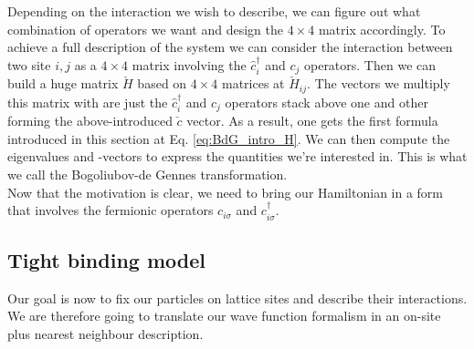 \documentclass[../main.tex]{subfile}
\begin{document}
Depending on the interaction we wish to describe, we can figure out what combination of operators we want and design the $4\times4$ matrix accordingly.
To achieve a full description of the system we can consider the interaction between two site $i,j$ as a $4\times4$ matrix involving the $\hat{c}_i^{\dagger}$ and $c_j$ operators.
Then we can build a huge matrix $\check{H}$ based on $4\times4$ matrices at $\check{H}_{ij}$. The vectors we multiply this matrix with are just the $\hat{c}_i^{\dagger}$ and $c_j$ operators 
stack above one and other forming the above-introduced $\check{c}$ vector. As a result, one gets the first formula introduced in this section at Eq. \ref{eq:BdG_intro_H}.
We can then compute the eigenvalues and -vectors to express the quantities we're interested in. This is what we call the Bogoliubov-de Gennes transformation.\\

Now that the motivation is clear, we need to bring our Hamiltonian in a form that involves the fermionic operators $c_{i\sigma}$ and $c_{i\sigma}^{\dagger}$. 
 
\subsection{Tight binding model}
Our goal is now to fix our particles on lattice sites and describe their interactions. We are therefore going to translate our wave function formalism in an on-site plus
nearest neighbour description.\\
\end{document}
